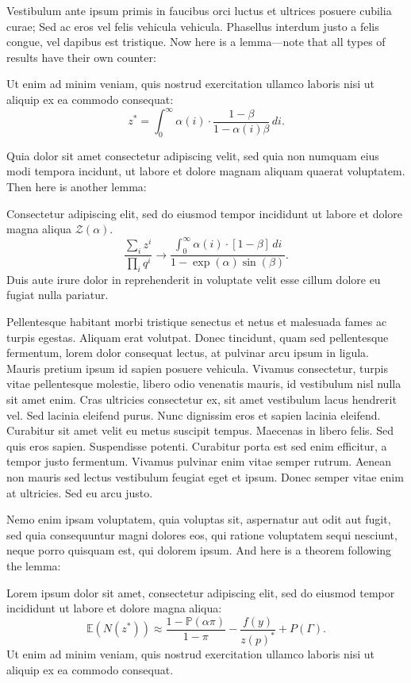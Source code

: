 \documentclass[letterpaper,11pt,leqno]{article}
\begin{document}
Vestibulum ante ipsum primis in faucibus orci luctus et ultrices posuere cubilia curae; Sed ac eros vel felis vehicula vehicula. Phasellus interdum justo a felis congue, vel dapibus est tristique. Now here is a lemma---note that all types of results have their own counter:
\begin{lemma} 
Ut enim ad minim veniam, quis nostrud exercitation ullamco laboris nisi ut aliquip ex ea commodo consequat:
\begin{equation}
z^* = \int_{0}^{\infty} \alpha(i) \cdot \frac{1-\beta}{1-\alpha(i)\beta}\,di.
\label{e:cv}\end{equation}
\label{p:cv}\end{lemma}

Quia dolor sit amet consectetur adipiscing velit, sed quia non numquam eius modi tempora incidunt, ut labore et dolore magnam aliquam quaerat voluptatem. Then here is another lemma:
\begin{lemma}
Consectetur adipiscing elit, sed do eiusmod tempor incididunt ut labore et dolore magna aliqua $\mathcal{Z}(\alpha)$. 
\begin{equation*}
\frac{\sum_i z^i}{\prod_i q^i} \to \frac{\int_{0}^{\infty} \alpha(i) \cdot [1-\beta]\,di}{1-\exp(\alpha)\sin(\beta)}.
\end{equation*}
Duis aute irure dolor in reprehenderit in voluptate velit esse cillum dolore eu fugiat nulla pariatur. 
\end{lemma}

Pellentesque habitant morbi tristique senectus et netus et malesuada fames ac turpis egestas. Aliquam erat volutpat. Donec tincidunt, quam sed pellentesque fermentum, lorem dolor consequat lectus, at pulvinar arcu ipsum in ligula. Mauris pretium ipsum id sapien posuere vehicula. Vivamus consectetur, turpis vitae pellentesque molestie, libero odio venenatis mauris, id vestibulum nisl nulla sit amet enim. Cras ultricies consectetur ex, sit amet vestibulum lacus hendrerit vel. Sed lacinia eleifend purus. Nunc dignissim eros et sapien lacinia eleifend. Curabitur sit amet velit eu metus suscipit tempus. Maecenas in libero felis. Sed quis eros sapien. Suspendisse potenti. Curabitur porta est sed enim efficitur, a tempor justo fermentum. Vivamus pulvinar enim vitae semper rutrum. Aenean non mauris sed lectus vestibulum feugiat eget et ipsum. Donec semper vitae enim at ultricies. Sed eu arcu justo.

Nemo enim ipsam voluptatem, quia voluptas sit, aspernatur aut odit aut fugit, sed quia consequuntur magni dolores eos, qui ratione voluptatem sequi nesciunt, neque porro quisquam est, qui dolorem ipsum. And here is a theorem following the lemma:
\begin{theorem} 
Lorem ipsum dolor sit amet, consectetur adipiscing elit, sed do eiusmod tempor incididunt ut labore et dolore magna aliqua:
\begin{equation*}
\mathbb{E}(N(z^*)) \approx \frac{1-\mathbb{P}(\alpha\pi)}{1-\pi}- \frac{f(y)}{z(p)^*} + P(\Gamma).
\end{equation*}
Ut enim ad minim veniam, quis nostrud exercitation ullamco laboris nisi ut aliquip ex ea commodo consequat.
\end{theorem}
\end{document}

